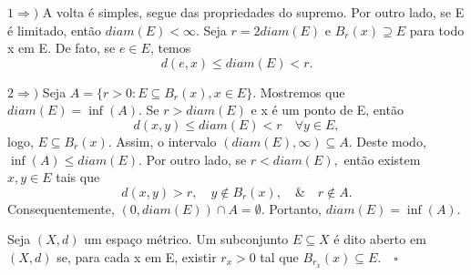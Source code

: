 \documentclass[MetricSpaces/metric_notes.tex]{subfiles}
\begin{document}
\begin{proof*}
	\(1 \Rightarrow )\) A volta é simples, segue das propriedades do supremo. Por outro lado, se E é limitado, então \(diam(E) < \infty\). Seja
	\(r=2diam(E)\) e \(B_{r}(x)\supseteq{E}\) para todo x em E. De fato, se \(e\in E\), temos
	\[
		d(e, x)\leq diam(E) < r.
	\]

	\(2 \Rightarrow )\) Seja \(A = \{r>0: E \subseteq{B_{r}(x)}, x\in E\}\). Mostremos que \(diam(E) = \inf{(A)}.\) Se \(r > diam(E)\) e x
	é um ponto de E, então
	\[
		d(x, y)\leq diam(E) < r\quad \forall y\in E,
	\]
	logo, \(E\subseteq{B_{r}(x)}\). Assim, o intervalo \((diam(E), \infty)\subseteq{A}.\) Deste modo, \(\inf{(A)}\leq diam(E).\)
	Por outro lado, se \(r < diam(E),\) então existem \(x, y\in E\) tais que
	\[
		d(x, y) > r,\quad y\not\in B_{r}(x),\quad \&\quad r\not\in A.
	\]
	Consequentemente, \((0, diam(E))\cap A = \emptyset.\) Portanto, \(diam(E) = \inf{(A)}.\) \qedsymbol
\end{proof*}
\begin{def*}
	Seja \((X, d)\) um espaço métrico. Um subconjunto \(E\subseteq{X}\) é dito aberto em \((X, d)\) se, para cada
	x em E, existir \(r_{x} > 0\) tal que \(B_{r_{x}}(x)\subseteq{E}.\quad\square\)
\end{def*}
\end{document}
